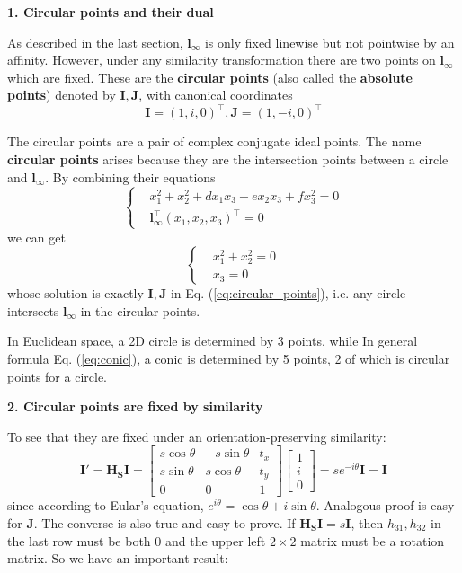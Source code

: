 \documentclass[12pt]{article}
\numberwithin{equation}{section}
\begin{document}
\textbf{1. Circular points and their dual} 

As described in the last section, $\mathbf{l}_{\infty}$ is only fixed linewise but not pointwise by an affinity. However, under any similarity transformation there are two points on $\mathbf{l}_{\infty}$ which are fixed. These are the \textbf{circular points} (also called the \textbf{absolute points}) denoted by $\mathbf{I, J}$, with canonical coordinates 
\begin{equation}
\mathbf{I} = (1, i, 0)^\top, \mathbf{J} = (1, -i, 0)^\top
\label{eq:circular_points}
\end{equation}

The circular points are a pair of complex conjugate ideal points. The name \textbf{circular points} arises because they are the intersection points between a circle and $\mathbf{l}_{\infty}$. By combining their equations
\begin{equation*}
\begin{cases}
& x_1^2 + x_2^2 + dx_1x_3 + ex_2x_3 + fx_3^2 = 0 \\
& \mathbf{l}_{\infty}^\top(x_1, x_2, x_3)^\top = 0
\end{cases}
\end{equation*}
we can get 
\begin{equation}
\begin{cases}
& x_1^2 + x_2^2 = 0 \\
& x_3 = 0
\end{cases}
\label{eq:circular_points_eq}
\end{equation}
whose solution is exactly $\mathbf{I, J}$ in Eq. (\ref{eq:circular_points}), i.e. any circle intersects $\mathbf{l}_{\infty}$ in the circular points.

In Euclidean space, a 2D circle is determined by 3 points, while In general formula Eq. (\ref{eq:conic}), a conic is determined by 5 points, 2 of which is circular points for a circle.

\textbf{2. Circular points are fixed by similarity} 

To see that they are fixed under an orientation-preserving similarity:
\begin{equation}
\mathbf{I}' = \mathbf{H_S I} = 
\begin{bmatrix}
s \cos \theta & -s\sin \theta & t_x \\
s \sin \theta & s\cos \theta & t_y \\
0 & 0 & 1
\end{bmatrix}
\begin{bmatrix}
1\\
i\\
0
\end{bmatrix}
=
s e^{-i\theta} \mathbf{I} = \mathbf{I}
\label{eq:circular_points_fixed}
\end{equation}
since according to Eular's equation, $e^{i\theta} = \cos \theta + i \sin \theta$. Analogous proof is easy for $\mathbf{J}$. The converse is also true and easy to prove. If $\mathbf{H_S I} = s\mathbf{I}$, then $h_{31}, h_{32}$ in the last row must be both 0 and the upper left $2\times 2$ matrix must be a rotation matrix. So we have an important result: \\
\end{document}
